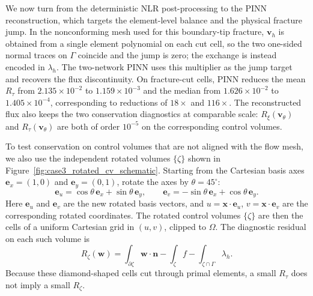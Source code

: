 \documentclass[a4paper,fleqn]{cas-sc}
\newcommand{\vflux}{\mathbf{v}}
\begin{document}
We now turn from the deterministic NLR post-processing to the PINN
reconstruction, which targets the element-level balance and the physical
fracture jump. In the nonconforming mesh used for this boundary-tip fracture,
\(\vflux_h\) is obtained from a single element polynomial on each cut cell, so
the two one-sided normal traces on \(\Gamma\) coincide and the jump is zero; the
exchange is instead encoded in \(\lambda_h\). The two-network PINN uses this
multiplier as the jump target and
recovers the flux discontinuity. On fracture-cut cells, PINN reduces the mean
\(R_\tau\) from \(2.135\times10^{-2}\) to \(1.159\times10^{-3}\) and the
median from \(1.626\times10^{-2}\) to \(1.405\times10^{-4}\), corresponding
to reductions of \(18\times\) and \(116\times\). The reconstructed flux also
keeps the two conservation diagnostics at comparable scale:
\(R_\xi(\vflux_\theta)\) and \(R_\tau(\vflux_\theta)\) are both of order
\(10^{-5}\) on the corresponding control volumes.

To test conservation on control volumes that are not aligned with the flow
mesh, we also use the independent rotated volumes \(\{\zeta\}\) shown in
Figure~\ref{fig:case3_rotated_cv_schematic}. Starting from the Cartesian basis axes
\(\mathbf{e}_x=(1,0)\) and \(\mathbf{e}_y=(0,1)\), rotate the axes by
\(\theta=45^\circ\):
\[
  \mathbf{e}_u=\cos\theta\,\mathbf{e}_x+\sin\theta\,\mathbf{e}_y,
  \qquad
  \mathbf{e}_v=-\sin\theta\,\mathbf{e}_x+\cos\theta\,\mathbf{e}_y .
\]
Here \(\mathbf{e}_u\) and \(\mathbf{e}_v\) are the new rotated basis vectors, and
\(u=\mathbf{x}\cdot\mathbf{e}_u\), \(v=\mathbf{x}\cdot\mathbf{e}_v\) are the
corresponding rotated coordinates. The rotated control volumes \(\{\zeta\}\) are
then the cells of a uniform Cartesian grid in \((u,v)\), clipped to \(\Omega\).
The diagnostic residual on each such volume is
\[
  R_\zeta(\mathbf{w})
  =
  \int_{\partial\zeta}\mathbf{w}\cdot\mathbf{n}
  - \int_\zeta f
  - \int_{\zeta\cap\Gamma}\lambda_h .
\]
Because these diamond-shaped cells cut through primal elements, a small
\(R_\tau\) does not imply a small \(R_\zeta\).
\end{document}
